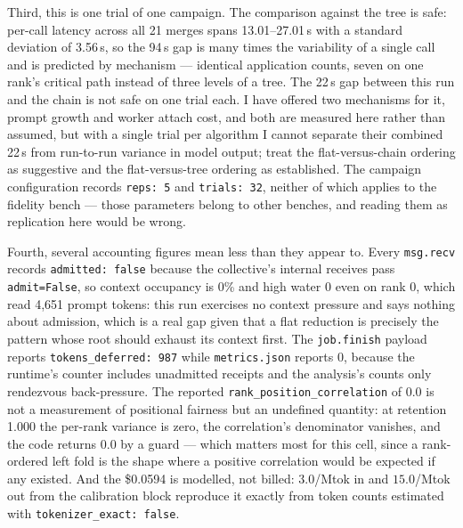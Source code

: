 \documentclass[11pt]{article}
\begin{document}
Third, this is one trial of one campaign. The comparison against the tree is safe:
per-call latency across all 21 merges spans 13.01--27.01\,s with a standard deviation of
3.56\,s, so the 94\,s gap is many times the variability of a single call and is predicted
by mechanism --- identical application counts, seven on one rank's critical path instead
of three levels of a tree. The 22\,s gap between this run and the chain is not safe on
one trial each. I have offered two mechanisms for it, prompt growth and worker attach
cost, and both are measured here rather than assumed, but with a single trial per
algorithm I cannot separate their combined 22\,s from run-to-run variance in model
output; treat the flat-versus-chain ordering as suggestive and the flat-versus-tree
ordering as established. The campaign configuration records \texttt{reps: 5} and
\texttt{trials: 32}, neither of which applies to the fidelity bench --- those parameters
belong to other benches, and reading them as replication here would be wrong.

Fourth, several accounting figures mean less than they appear to. Every \texttt{msg.recv}
records \texttt{admitted: false} because the collective's internal receives pass
\texttt{admit=False}, so context occupancy is 0\% and high water 0 even on rank 0, which
read 4{,}651 prompt tokens: this run exercises no context pressure and says nothing about
admission, which is a real gap given that a flat reduction is precisely the pattern whose
root should exhaust its context first. The \texttt{job.finish} payload reports
\texttt{tokens\_deferred: 987} while \texttt{metrics.json} reports 0, because the
runtime's counter includes unadmitted receipts and the analysis's counts only rendezvous
back-pressure. The reported \texttt{rank\_position\_correlation} of 0.0 is not a
measurement of positional fairness but an undefined quantity: at retention 1.000 the
per-rank variance is zero, the correlation's denominator vanishes, and the code returns
0.0 by a guard --- which matters most for this cell, since a rank-ordered left fold is the
shape where a positive correlation would be expected if any existed. And the \$0.0594 is
modelled, not billed: $3.0$/Mtok in and $15.0$/Mtok out from the calibration block
reproduce it exactly from token counts estimated with \texttt{tokenizer\_exact: false}.
\end{document}
